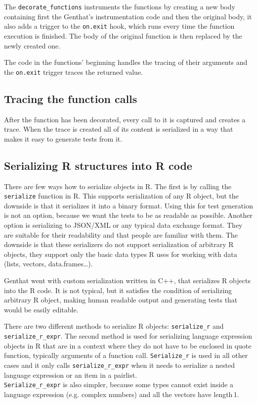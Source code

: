\documentclass[thesis=B,english]{FITthesis}[2012/10/20]
\begin{document}
The \verb|decorate_functions| instruments the functions by creating a new body containing first the Genthat’s instrumentation code and then the original body, it also adds a trigger to the \verb|on.exit| hook, which runs every time the function execution is finished. The body of the original function is then replaced by the newly created one.

The code in the functions’ beginning handles the tracing of their arguments and the \verb|on.exit| trigger traces the returned value.

\subsection{Tracing the function calls}
After the function has been decorated, every call to it is captured and creates a trace. When the trace is created all of its content is serialized in a way that makes it easy to generate tests from it.

\subsection{Serializing R structures into R code}
There are few ways how to serialize objects in R. The first is by calling the \verb|serialize| function in R. This supports serialization of any R object, but the downside is that it serializes it into a binary format. Using this for test generation is not an option, because we want the tests to be as readable as possible. Another option is serializing to JSON/XML or any typical data exchange format. They are suitable for their readability and that people are familiar with them. The downside is that these serializers do not support serialization of arbitrary R objects, they support only the basic data types R uses for working with data (lists, vectors, data.frames…).

Genthat went with custom serialization written in C++, that serializes R objects into the R code. It is not typical, but it satisfies the condition of serializing arbitrary R object, making human readable output and generating tests that would be easily editable.

There are two different methods to serialize R objects: \verb|serialize_r| and \verb|serialize_r_expr|. The second method is used for serializing language expression objects in R that are in a context where they do not have to be enclosed in quote function, typically arguments of a function call. \verb|Serialize_r| is used in all other cases and it only calls \verb|serialize_r_expr| when it needs to serialize a nested language expression or an item in a pairlist. \\ \verb|Serialize_r_expr| is also simpler, because some types cannot exist inside a language expression (e.g. complex numbers) and all the vectors have length\,1.
\end{document}
